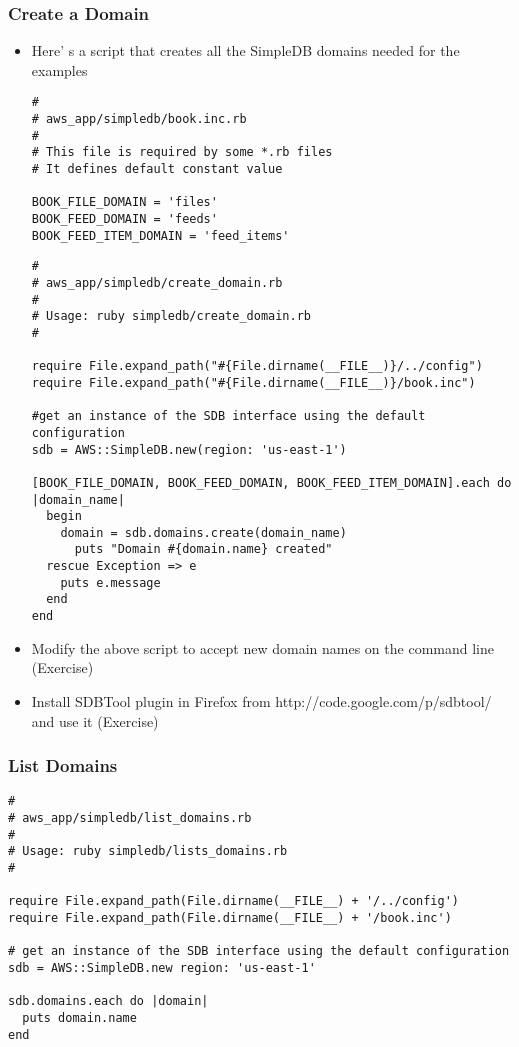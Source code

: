 \documentclass{beamer}
\begin{document}
\begin{frame}
\frametitle{Create a Domain}
\begin{itemize}
\item Here’ s a script that creates all the SimpleDB domains needed for the examples
\lstset{language=Ruby, style=eclipse}
\begin{lstlisting}[escapechar=!]
#
# aws_app/simpledb/book.inc.rb
#
# This file is required by some *.rb files
# It defines default constant value

BOOK_FILE_DOMAIN = 'files'
BOOK_FEED_DOMAIN = 'feeds'
BOOK_FEED_ITEM_DOMAIN = 'feed_items'
\end{lstlisting}
\lstset{language=Ruby, style=eclipse}
\begin{lstlisting}[escapechar=!]
#
# aws_app/simpledb/create_domain.rb
#
# Usage: ruby simpledb/create_domain.rb
#

require File.expand_path("#{File.dirname(__FILE__)}/../config")
require File.expand_path("#{File.dirname(__FILE__)}/book.inc")

#get an instance of the SDB interface using the default configuration
sdb = AWS::SimpleDB.new(region: 'us-east-1')

[BOOK_FILE_DOMAIN, BOOK_FEED_DOMAIN, BOOK_FEED_ITEM_DOMAIN].each do |domain_name|
  begin
    domain = sdb.domains.create(domain_name)
      puts "Domain #{domain.name} created"
  rescue Exception => e
    puts e.message
  end
end
\end{lstlisting}

\item Modify the above script to accept new domain names on the command line (Exercise)
\item Install SDBTool plugin in Firefox from http://code.google.com/p/sdbtool/ and use it (Exercise)
\end{itemize}

\end{frame}

\begin{frame}[fragile]
\frametitle{List Domains}

\lstset{language=Ruby, style=eclipse}
\begin{lstlisting}[escapechar=!]
#
# aws_app/simpledb/list_domains.rb
#
# Usage: ruby simpledb/lists_domains.rb
#

require File.expand_path(File.dirname(__FILE__) + '/../config')
require File.expand_path(File.dirname(__FILE__) + '/book.inc')

# get an instance of the SDB interface using the default configuration
sdb = AWS::SimpleDB.new region: 'us-east-1'

sdb.domains.each do |domain|
  puts domain.name
end
\end{lstlisting}

\end{frame}
\end{document}
